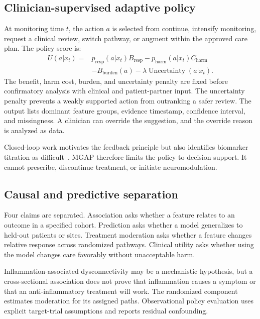 \documentclass[conference]{IEEEtran}
\begin{document}
\subsection{Clinician-supervised adaptive policy}
At monitoring time $t$, the action $a$ is selected from continue, intensify monitoring, request a clinical review, switch pathway, or augment within the approved care plan. The policy score is:
\begin{equation}
\begin{aligned}
U(a|x_t)={}&p_{\mathrm{resp}}(a|x_t)B_{\mathrm{resp}}
-p_{\mathrm{harm}}(a|x_t)C_{\mathrm{harm}}\\
&-B_{\mathrm{burden}}(a)-\lambda\operatorname{Uncertainty}(a|x_t).
\end{aligned}
\label{eq:utility}
\end{equation}
The benefit, harm cost, burden, and uncertainty penalty are fixed before confirmatory analysis with clinical and patient-partner input. The uncertainty penalty prevents a weakly supported action from outranking a safer review. The output lists dominant feature groups, evidence timestamp, confidence interval, and missingness. A clinician can override the suggestion, and the override reason is analyzed as data.

Closed-loop work motivates the feedback principle but also identifies biomarker titration as difficult~\cite{lo2017}. MGAP therefore limits the policy to decision support. It cannot prescribe, discontinue treatment, or initiate neuromodulation.

\subsection{Causal and predictive separation}
Four claims are separated. Association asks whether a feature relates to an outcome in a specified cohort. Prediction asks whether a model generalizes to held-out patients or sites. Treatment moderation asks whether a feature changes relative response across randomized pathways. Clinical utility asks whether using the model changes care favorably without unacceptable harm.

Inflammation-associated dysconnectivity may be a mechanistic hypothesis, but a cross-sectional association does not prove that inflammation causes a symptom or that an anti-inflammatory treatment will work. The randomized component estimates moderation for its assigned paths. Observational policy evaluation uses explicit target-trial assumptions and reports residual confounding.
\end{document}
